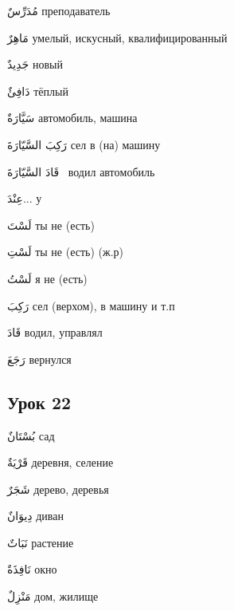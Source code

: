 \documentclass[a5paper]{article}
\newcommand\textstyleDropCaps[1]{#1}
\newcommand\textstyleCaptioncharacters[1]{#1}
\begin{document}
\textstyleCaptioncharacters{مُدَرِّسٌ }\textstyleDropCaps{преподаватель‎}

\textstyleCaptioncharacters{مَاهِرٌ }\textstyleDropCaps{умелый, искусный, квалифицированный‎}

\textstyleCaptioncharacters{جَدِيدٌ }\textstyleDropCaps{новый‎}

\textstyleCaptioncharacters{دَافِئٌ }\textstyleDropCaps{тёплый‎}

\textstyleCaptioncharacters{سَيَّارَةٌ }\textstyleDropCaps{автомобиль, маши­на‎}

\textstyleCaptioncharacters{رَكِبَ السَّيّارَةَ }\textstyleDropCaps{сел в (на) машину‎}

\textstyleCaptioncharacters{قَادَ السَّيّارَةَ \ }\textstyleDropCaps{водил авто­мобиль‎}

\textstyleCaptioncharacters{عِنْدَ...ِ }\textstyleDropCaps{у‎}

\textstyleCaptioncharacters{لَسْتَ }\textstyleDropCaps{ты не (есть)‎}

\textstyleCaptioncharacters{لَسْتِ }\textstyleDropCaps{ты не (есть) (ж.р)‎}

\textstyleCaptioncharacters{لَسْتُ }\textstyleDropCaps{я не (есть)‎}

\textstyleCaptioncharacters{رَكِبَ }\textstyleDropCaps{сел (верхом), в ма­шину и т.п‎}

\textstyleCaptioncharacters{قَادَ }\textstyleDropCaps{водил, управлял‎}

\textstyleCaptioncharacters{رَجَعَ }\textstyleDropCaps{вернулся‎}

\subsection[Урок 22‎]{\textstyleDropCaps{Урок 22‎}}
\textstyleCaptioncharacters{بُسْتَانٌ }\textstyleDropCaps{сад‎}

\textstyleCaptioncharacters{قَرْيَةٌ }\textstyleDropCaps{деревня, селение‎}

\textstyleCaptioncharacters{شَجَرٌ }\textstyleDropCaps{дерево, деревья‎}

\textstyleCaptioncharacters{دِيوَانٌ }\textstyleDropCaps{диван‎}

\textstyleCaptioncharacters{نَبَاتٌ }\textstyleDropCaps{растение‎}

\textstyleCaptioncharacters{نَافِذَةٌ }\textstyleDropCaps{окно‎}

\textstyleCaptioncharacters{مَنْزِلٌ }\textstyleDropCaps{дом, жилище‎}
\end{document}
